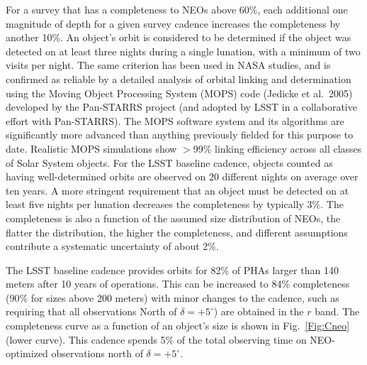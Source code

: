 \documentclass{emulateapj}
\begin{document}
For a survey that has a completeness to NEOs above 60\%, each
additional one magnitude of depth for a given survey cadence increases
the completeness by another 10\%.  An object's orbit is considered to be 
determined if the object was detected on at least three nights during a single 
lunation, with a minimum of two visits per night. The same criterion
has been used in NASA studies,
and is confirmed as 
reliable by a detailed analysis of orbital linking and determination using
the Moving Object Processing System (MOPS) code (Jedicke et al.~2005) developed by the Pan-STARRS project (and 
adopted by LSST in a collaborative effort with Pan-STARRS). The MOPS software
system and its algorithms are significantly more advanced than
anything previously 
fielded for this purpose to date. Realistic MOPS simulations show 
$>$99\% linking efficiency across all classes of Solar System objects. 
For the LSST baseline cadence, objects
counted as having well-determined orbits are observed on 20 different nights on average over ten
years. A more stringent requirement that an object must be detected on at least 
five nights per lunation decreases the completeness by typically 3\%. 
The completeness is also a function of the assumed size distribution of NEOs, the flatter the distribution, the 
higher the completeness, and different assumptions contribute a systematic uncertainty of about 2\%. 

The LSST baseline cadence provides orbits for 82\% of PHAs larger than 140
meters after 10 years of operations.  This can be increased to 84\%
completeness (90\% for sizes above 200 meters) with minor changes to
the cadence, such as 
requiring that all observations North of $\delta =+5^\circ$) are
obtained in the $r$ band.  The completeness curve as a function of an object's size is shown 
in Fig.~\ref{Fig:Cneo} (lower curve). This cadence spends 5\% of the total 
observing time on NEO-optimized observations north of $\delta = +5^\circ$.
\end{document}
